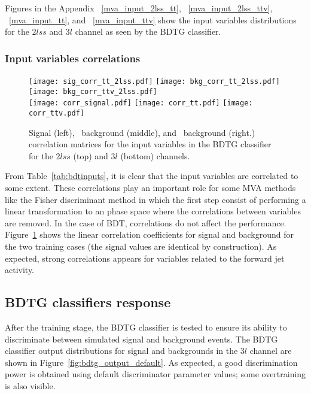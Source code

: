 Figures in the Appendix ~\ref{mva_input_2lss_tt}, ~\ref{mva_input_2lss_ttv}, ~\ref{mva_input_tt}, and ~\ref{mva_input_ttv} show the input variables distributions for the $2lss$ and $3l$ channel as seen by the BDTG classifier. 

\subsubsection*{Input variables correlations}

\begin{figure} [!ht]
  \centering
      \texttt{[image: sig\_corr\_tt\_2lss.pdf]}
      \texttt{[image: bkg\_corr\_tt\_2lss.pdf]}
      \texttt{[image: bkg\_corr\_ttv\_2lss.pdf]}\\
      \texttt{[image: corr\_signal.pdf]}
      \texttt{[image: corr\_tt.pdf]}
      \texttt{[image: corr\_ttv.pdf]}
\caption[Correlation matrices for the BDT input variables.]{ Signal (left), \ttbar\ background (middle), and \ttV\ background (right.) correlation matrices for the input variables in the BDTG classifier for the $2lss$ (top) and  $3l$ (bottom) channels.}
\label{mva_corr}
\end{figure}

From Table~\ref{tab:bdtinputs}, it is clear that the input variables are correlated to some extent. These correlations play an important role for some MVA methods like the Fisher discriminant method in which the first step consist of performing a linear transformation to an phase space where the correlations between variables are removed. In the case of BDT, correlations do not affect the performance. Figure~\ref{mva_corr} shows the linear correlation coefficients for signal and background for the two training cases (the signal values are identical by construction). As expected, strong correlations appears for variables related to the forward jet activity.

\subsection{BDTG classifiers response}

After the training stage, the BDTG classifier is tested to ensure its ability to discriminate between simulated signal and background events. The BDTG classifier output distributions for signal and backgrounds in the $3l$ channel are shown in Figure~\ref{fig:bdtg_output_default}. As expected, a good discrimination power is obtained using default discriminator parameter values; some overtraining is also visible.

